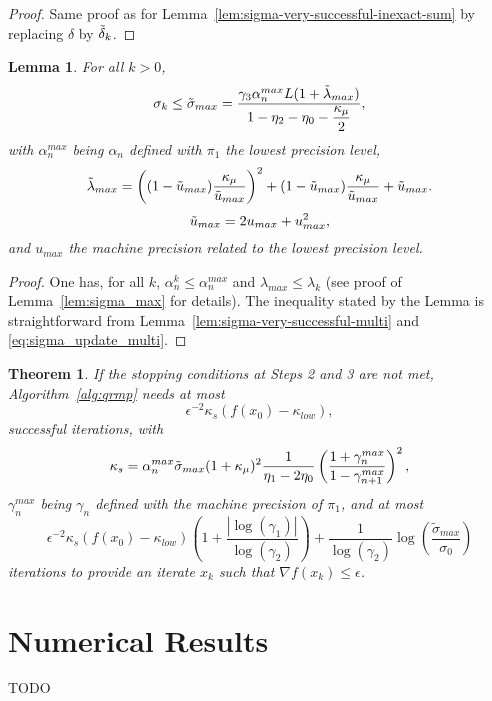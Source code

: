 \documentclass{article}[12pt]
\newtheorem{lemma}[]{Lemma}
\newtheorem{theorem}[]{Theorem}
\begin{document}
	\begin{proof}
		Same proof as for Lemma~\ref{lem:sigma-very-successful-inexact-sum} by replacing $\delta$ by $\tilde{\delta}_{k}$.
	\end{proof}

	\begin{lemma}
		\label{lem:sigma_max_mp}
		For all $k>0$,
		\begin{equation}
			\sigma_k \leq \tilde{\sigma}_{max} =  \dfrac{\gamma_3 \alpha_n^{max}L(1+\tilde{\lambda}_{max})}{ 1-\eta_2 - \eta_0 - \dfrac{\kappa_\mu}{2}},
		\end{equation}
		with $\alpha_n^{max}$ being $\alpha_n$ defined with $\pi_1$ the lowest precision level, 
		\begin{equation*}
			\tilde{\lambda}_{max} = \left((1-\tilde{u}_{max})\dfrac{\kappa_\mu}{\tilde{u}_{max}}\right)^2 + (1-\tilde{u}_{max})\dfrac{\kappa_\mu}{\tilde{u}_{max}} +\tilde{u}_{max}.
		\end{equation*}
		\begin{equation*}
			\tilde{u}_{max} = 2u_{max}+u_{max}^2,
		\end{equation*} and $u_{max}$ the machine precision related to the lowest precision level.
	\end{lemma}
	\begin{proof}
		One has, for all $k$, $\alpha_n^k \leq \alpha_n^{max}$ and $\lambda_{max} \leq \lambda_k$ (see proof of Lemma~\ref{lem:sigma_max} for details). The inequality stated by the Lemma is straightforward from Lemma~\ref{lem:sigma-very-successful-multi} and \eqref{eq:sigma_update_multi}.
	\end{proof}

	\begin{theorem}
		\label{th:complexity_mp}
		If the stopping conditions at Steps 2 and 3 are not met, Algorithm~\ref{alg:qrmp} needs at most
		\begin{equation*}
			\epsilon^{-2}\kappa_s(f(x_0)-\kappa_{low}),
		\end{equation*}
		successful iterations, with 
		\begin{equation}
			\kappa_s=\alpha_n^{max}\tilde{\sigma}_{max}(1+\kappa_\mu)^2 \dfrac{1}{\eta_1-2\eta_0}\left(\dfrac{1+\gamma_n^{max}}{1-\gamma_{n+1}^{max}}\right)^2,
		\end{equation} $\gamma_{n}^{max}$ being $\gamma_{n}$ defined with the machine precision of $\pi_1$, and at most  
		\begin{equation*}
			\epsilon^{-2}\kappa_s(f(x_0)-\kappa_{low}) \left(1+\dfrac{|\log(\gamma_1)|}{\log(\gamma_2)}\right) +\dfrac{1}{\log(\gamma_2)}\log\left(\dfrac{\tilde{\sigma}_{max}}{\sigma_0}\right)
		\end{equation*}
		iterations to provide an iterate $x_k$ such that $\nabla f(x_k)\leq \epsilon$.
	\end{theorem}
	
	
	\section{Numerical Results}
	
	TODO
	
	
	
\end{document}
